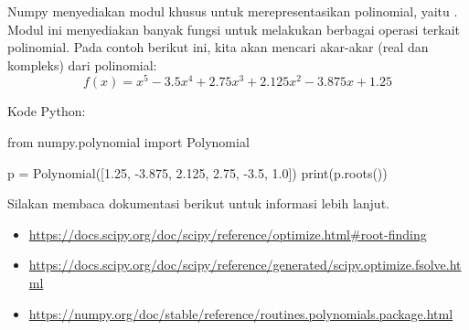 Numpy menyediakan modul khusus untuk merepresentasikan polinomial, yaitu
. Modul ini menyediakan banyak fungsi untuk
melakukan berbagai operasi terkait polinomial.
Pada contoh berikut ini, kita akan mencari akar-akar (real dan kompleks)
dari polinomial:
\begin{equation*}
f(x) = x^5 - 3.5x^4 + 2.75x^3 + 2.125x^2 - 3.875x + 1.25
\end{equation*}

Kode Python:
\begin{pythoncode}
from numpy.polynomial import Polynomial

p = Polynomial([1.25, -3.875, 2.125, 2.75, -3.5, 1.0])
print(p.roots())
\end{pythoncode}

Silakan membaca dokumentasi berikut untuk informasi lebih lanjut.
\begin{itemize}
\item {\scriptsize\url{https://docs.scipy.org/doc/scipy/reference/optimize.html\#root-finding}}
\item {\scriptsize\url{https://docs.scipy.org/doc/scipy/reference/generated/scipy.optimize.fsolve.html}}
\item {\scriptsize\url{https://numpy.org/doc/stable/reference/routines.polynomials.package.html}}
\end{itemize}

